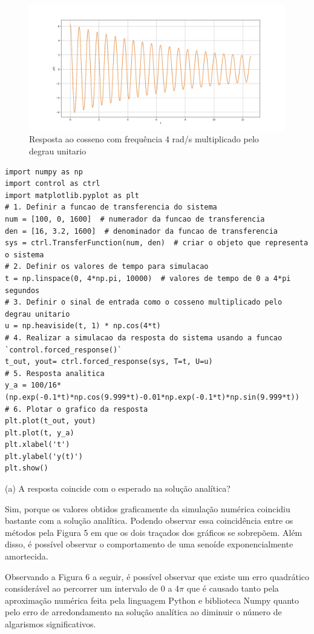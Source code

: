 \documentclass[10pt]{article}
\begin{document}
\begin{figure}[h]
    \centering
    \includegraphics[scale=0.4]{questao2.png}
    \caption{Resposta ao cosseno com frequência 4 rad/s multiplicado pelo degrau unitario}
\end{figure}


\begin{lstlisting}
import numpy as np
import control as ctrl
import matplotlib.pyplot as plt
# 1. Definir a funcao de transferencia do sistema
num = [100, 0, 1600]  # numerador da funcao de transferencia
den = [16, 3.2, 1600]  # denominador da funcao de transferencia
sys = ctrl.TransferFunction(num, den)  # criar o objeto que representa o sistema
# 2. Definir os valores de tempo para simulacao
t = np.linspace(0, 4*np.pi, 10000)  # valores de tempo de 0 a 4*pi segundos
# 3. Definir o sinal de entrada como o cosseno multiplicado pelo degrau unitario
u = np.heaviside(t, 1) * np.cos(4*t)
# 4. Realizar a simulacao da resposta do sistema usando a funcao `control.forced_response()`
t_out, yout= ctrl.forced_response(sys, T=t, U=u)
# 5. Resposta analitica
y_a = 100/16*(np.exp(-0.1*t)*np.cos(9.999*t)-0.01*np.exp(-0.1*t)*np.sin(9.999*t))
# 6. Plotar o grafico da resposta
plt.plot(t_out, yout)
plt.plot(t, y_a)
plt.xlabel('t')
plt.ylabel('y(t)')
plt.show()
\end{lstlisting}

(a) A resposta coincide com o esperado na solução analítica?

\quad Sim, porque os valores obtidos graficamente da simulação numérica coincidiu bastante com a solução analítica.
Podendo observar essa coincidência entre os métodos pela Figura 5 em que os dois traçados dos gráficos se sobrepõem.
Além disso, é possível observar o comportamento de uma senoíde exponencialmente amortecida.

\quad Observando a Figura 6 a seguir, é possível observar que existe um erro quadrático considerável
ao percorrer um intervalo de 0 a 4$\pi$ que é causado tanto pela aproximação numérica feita pela linguagem Python e biblioteca Numpy
quanto pelo erro de arredondamento na solução analítica ao diminuir o número de algarismos significativos.
\end{document}
